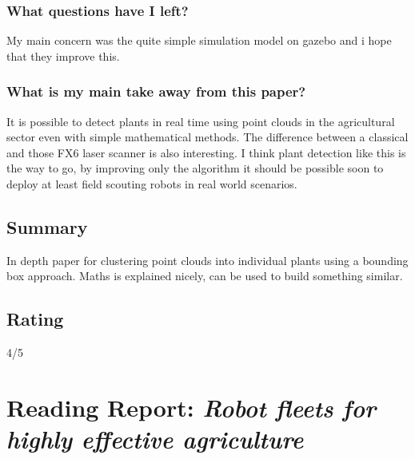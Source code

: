     \subsubsection*{What questions have I left?}
    My main concern was the quite simple simulation model on gazebo and i hope that they improve this.
    \subsubsection*{What is my main take away from this paper?}
    It is possible to detect plants in real time using point clouds in the agricultural sector even with 
    simple mathematical methods. The difference between a classical and those FX6 laser scanner is also interesting.
    I think plant detection like this is the way to go, by improving only the algorithm it should be possible
    soon to deploy at least field scouting robots in real world scenarios. 
    
    \subsection*{Summary}
    In depth paper for clustering point clouds into individual plants using a bounding box approach.
    Maths is explained nicely, can be used to build something similar.
    
    \subsection*{Rating}
    4/5

    \newpage
    
    \section{Reading Report: \emph{Robot fleets for highly effective agriculture}}
    \cite{ConesaMunoz2015}
    
